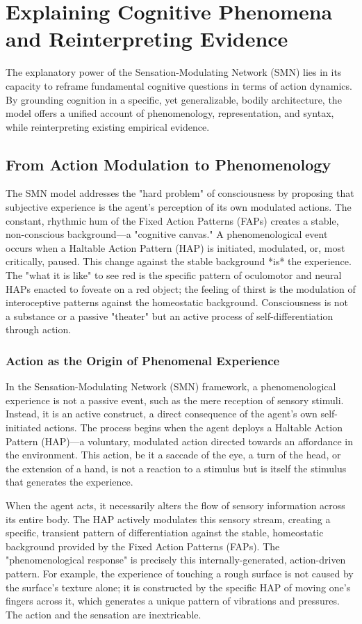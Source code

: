 \section{Explaining Cognitive Phenomena and Reinterpreting Evidence}
The explanatory power of the Sensation-Modulating Network (SMN) lies in its capacity to reframe fundamental cognitive questions in terms of action dynamics. By grounding cognition in a specific, yet generalizable, bodily architecture, the model offers a unified account of phenomenology, representation, and syntax, while reinterpreting existing empirical evidence.

\subsection*{From Action Modulation to Phenomenology}
The SMN model addresses the "hard problem" of consciousness by proposing that subjective experience is the agent's perception of its own modulated actions. The constant, rhythmic hum of the Fixed Action Patterns (FAPs) creates a stable, non-conscious background—a "cognitive canvas." A phenomenological event occurs when a Haltable Action Pattern (HAP) is initiated, modulated, or, most critically, paused. This change against the stable background *is* the experience. The "what it is like" to see red is the specific pattern of oculomotor and neural HAPs enacted to foveate on a red object; the feeling of thirst is the modulation of interoceptive patterns against the homeostatic background. Consciousness is not a substance or a passive "theater" but an active process of self-differentiation through action.

\subsubsection*{Action as the Origin of Phenomenal Experience}
In the Sensation-Modulating Network (SMN) framework, a phenomenological experience is not a passive event, such as the mere reception of sensory stimuli. Instead, it is an active construct, a direct consequence of the agent's own self-initiated actions. The process begins when the agent deploys a Haltable Action Pattern (HAP)—a voluntary, modulated action directed towards an affordance in the environment. This action, be it a saccade of the eye, a turn of the head, or the extension of a hand, is not a reaction to a stimulus but is itself the stimulus that generates the experience.

When the agent acts, it necessarily alters the flow of sensory information across its entire body. The HAP actively modulates this sensory stream, creating a specific, transient pattern of differentiation against the stable, homeostatic background provided by the Fixed Action Patterns (FAPs). The "phenomenological response" is precisely this internally-generated, action-driven pattern. For example, the experience of touching a rough surface is not caused by the surface's texture alone; it is constructed by the specific HAP of moving one's fingers across it, which generates a unique pattern of vibrations and pressures. The action and the sensation are inextricable.


